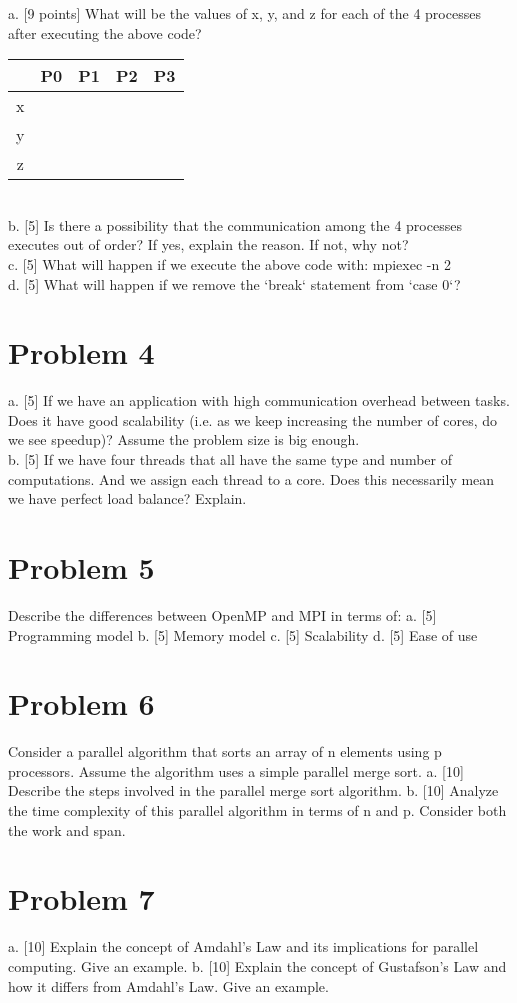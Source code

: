 \documentclass{article}
\begin{document}
a. [9 points] What will be the values of x, y, and z for each of the 4 processes after executing the above code?
\begin{tabular}{|c|c|c|c|c|}
\hline
 & P0 & P1 & P2 & P3 \\
\hline
x & & & & \\
y & & & & \\
z & & & & \\
\hline
\end{tabular}
\\
b. [5] Is there a possibility that the communication among the 4 processes executes out of order? If yes, explain the reason. If not, why not? \\
c. [5] What will happen if we execute the above code with: mpiexec -n 2 \\
d. [5] What will happen if we remove the `break` statement from `case 0`?


\section*{Problem 4}
a. [5] If we have an application with high communication overhead between tasks. Does it have good scalability (i.e. as we keep increasing the number of cores, do we see speedup)? Assume the problem size is big enough. \\
b. [5] If we have four threads that all have the same type and number of computations. And we assign each thread to a core. Does this necessarily mean we have perfect load balance? Explain.

\section*{Problem 5}
Describe the differences between OpenMP and MPI in terms of:
a. [5] Programming model
b. [5] Memory model
c. [5] Scalability
d. [5] Ease of use

\section*{Problem 6}
Consider a parallel algorithm that sorts an array of n elements using p processors.  Assume the algorithm uses a simple parallel merge sort.
a. [10] Describe the steps involved in the parallel merge sort algorithm.
b. [10] Analyze the time complexity of this parallel algorithm in terms of n and p.  Consider both the work and span.

\section*{Problem 7}
a. [10] Explain the concept of Amdahl's Law and its implications for parallel computing.  Give an example.
b. [10] Explain the concept of Gustafson's Law and how it differs from Amdahl's Law. Give an example.
\end{document}
